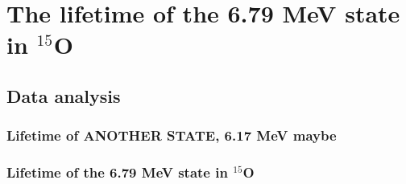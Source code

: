 %
%
%
%
%
%
%
%
%
%


%
%

\chapter{The lifetime of the 6.79 MeV state in $^{15}$O}
\label{chap: lifetime}

\section{Data analysis}
\label{sec: lifetime analysis}


\subsection{Lifetime of \textbf{ANOTHER STATE, 6.17 MeV maybe}}

\subsection{Lifetime of the 6.79 MeV state in $^{15}$O}



%
% 
% 
